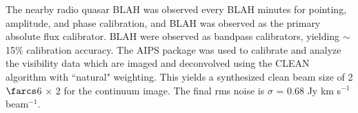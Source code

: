 \documentclass[]{emulateapj}
\begin{document}
The nearby radio quasar BLAH was observed every BLAH minutes for
pointing, amplitude, and phase calibration, and BLAH was observed as the primary
absolute flux calibrator. BLAH were observed as bandpass calibrators, yielding $\sim
$15\% calibration accuracy.
The AIPS package was used to calibrate and analyze the visibility data which are imaged and deconvolved using
the CLEAN algorithm with ``natural" weighting. This yields a synthesized clean beam size of 2$\farcs$6 $\times$ 2 for the continuum image. The final rms noise is $\sigma$ = 0.68 Jy km s$^{-1}$ beam$^{-1}$.
%
%
%
%
%
\end{document}
